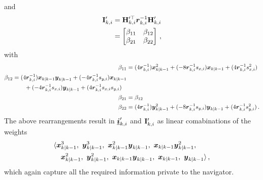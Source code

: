 \documentclass[10pt,letterpaper,oneside,twocolumn,journal]{IEEEtran}
\theoremstyle{definition}
\theoremstyle{definition}
\theoremstyle{remark}
\begin{document}
and
\begin{equation}
    \begin{split}
        \mat{I}'_{k,i} &= \mat{H}_{k,i}^{\prime\top} \rv{r}_{k,i}^{-1}\mat{H}'_{k,i} \\
        &=
        \begin{bmatrix}
            \beta_{11} & \beta_{12} \\
            \beta_{21} & \beta_{22}
        \end{bmatrix}\,,
    \end{split} \label{eqn:hrh_linear_comb}
\end{equation}
with
\begin{align*}
    \beta_{11} &= (4{\boldsymbol{r}}_{k,i}^{-1}){\boldsymbol{x}}_{k|k-1}^2 + (-8{\boldsymbol{r}}_{k,i}^{-1}s_{x,i}){\boldsymbol{x}}_{k|k-1} + (4{\boldsymbol{r}}_{k,i}^{-1}s_{x,i}^2) \\
    \begin{split}
        \beta_{12} &= (4{\boldsymbol{r}}_{k,i}^{-1}){\boldsymbol{x}}_{k|k-1}{\boldsymbol{y}}_{k|k-1} + (-4{\boldsymbol{r}}_{k,i}^{-1}s_{y,i}){\boldsymbol{x}}_{k|k-1}  \\
        &\qquad+ (-4{\boldsymbol{r}}_{k,i}^{-1}s_{x,i}){\boldsymbol{y}}_{k|k-1} + (4{\boldsymbol{r}}_{k,i}^{-1}s_{x,i}s_{y,i})
    \end{split}\\
    \beta_{21} &= \beta_{12} \\
    \beta_{22} &= (4{\boldsymbol{r}}_{k,i}^{-1}){\boldsymbol{y}}_{k|k-1}^2 + (-8{\boldsymbol{r}}_{k,i}^{-1}s_{y,i}){\boldsymbol{y}}_{k|k-1} + (4{\boldsymbol{r}}_{k,i}^{-1}s_{y,i}^2)\,.
\end{align*}
The above rearrangements result in ${\boldsymbol{\underline{i}}}'_{k,i}$ and ${{\mathbf{I}}}'_{k,i}$ as linear comabinations of the weights 
\begin{equation}
    \begin{split}
        &\langle \rv{x}_{k|k-1}^3,\ \rv{y}_{k|k-1}^3,\ \rv{x}_{k|k-1}^2\rv{y}_{k|k-1},\ \rv{x}_{k|k-1}\rv{y}_{k|k-1}^2,\\
        &\quad \rv{x}_{k|k-1}^2,\ \rv{y}_{k|k-1}^2,\ \rv{x}_{k|k-1}\rv{y}_{k|k-1},\ \rv{x}_{k|k-1},\ \rv{y}_{k|k-1}\rangle\,,
    \end{split} \label{eqn:weights_to_broadcast}
\end{equation}
which again capture all the required information private to the navigator.
\end{document}
